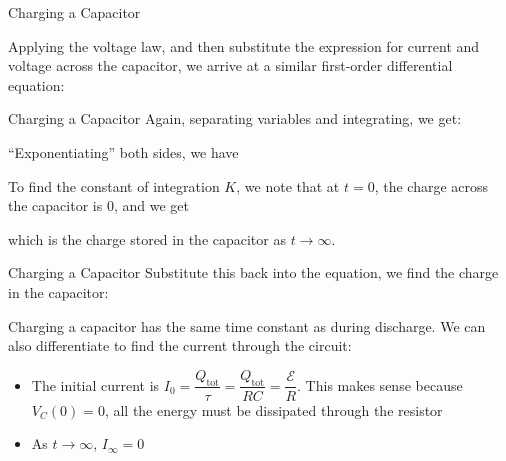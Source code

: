 \documentclass[12pt,aspectratio=169]{beamer}
\begin{document}
\begin{frame}{Charging a Capacitor}
  \begin{center}
  \end{center}
  Applying the voltage law, and then substitute the expression for current and
  voltage across the capacitor, we arrive at a similar first-order differential
  equation:

\end{frame}


\begin{frame}{Charging a Capacitor}
  Again, separating variables and integrating, we get:
  
  
  ``Exponentiating'' both sides, we have
  

  \vspace{-.1in}To find the constant of integration $K$, we note that at $t=0$,
  the charge across the capacitor is $0$, and we get


  \vspace{-.15in}which is the charge stored in the capacitor as
  $t\to\infty$.
  
\end{frame}




\begin{frame}{Charging a Capacitor}
  Substitute this back into the equation, we find the charge in the capacitor:


  Charging a capacitor has the same time constant as during discharge. We can
  also differentiate to find the current through the circuit:


  \begin{itemize}
  \item The initial current is
    $I_0=\dfrac{Q_\text{tot}}\tau=\dfrac{Q_\text{tot}}{RC}=\dfrac{\mathcal E}R$.
    This makes sense because $V_C(0)=0$, all the energy must be dissipated
    through the resistor
  \item As $t\to\infty$, $I_\infty=0$
  \end{itemize}
\end{frame}
\end{document}
